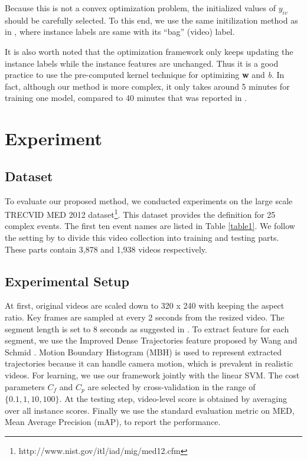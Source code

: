 Because this is not a convex optimization problem, the initialized values of $y_{iv}$ should be carefully selected. To this end, we use the same initilization method as in \cite{andrews2002support,lai2014video}, where instance labels are same with its ``bag'' (video) label. 

It is also worth noted that the optimization framework only keeps updating the instance labels while the instance features are unchanged. Thus it is a good practice to use the pre-computed kernel technique for optimizing \textbf{w} and \textit{b}. In fact, although our method is more complex, it only takes around 5 minutes for training one model, compared to 40 minutes that was reported in \cite{lai2014video}. 
\section{Experiment}
\label{c5_experiment}
\subsection{Dataset} To evaluate our proposed method, we conducted experiments on the large scale TRECVID MED 2012 dataset\footnote{http://www.nist.gov/itl/iad/mig/med12.cfm}. This dataset provides the definition for 25 complex events. The first ten event names are listed in Table \ref{table1}. We follow the setting by \cite{lai2014video} to divide this video collection into training and testing parts. These parts contain 3,878 and 1,938 videos respectively.

\subsection{Experimental Setup} At first, original videos are scaled down to 320 x 240 with keeping the aspect ratio. Key frames are sampled at every 2 seconds from the resized video. The segment length is set to 8 seconds as suggested in \cite{vahdat2013compositional}. To extract feature for each segment, we use the Improved Dense Trajectories feature proposed by Wang and Schmid \cite{wang2013action}. Motion Boundary Histogram (MBH) is used to represent extracted trajectories because it can handle camera motion, which is prevalent in realistic videos. For learning, we use our framework jointly with the linear SVM. The cost parameters $C_{f}$ and $C_{p}$ are selected by cross-validation in the range of $\{0.1, 1, 10, 100\}$. At the testing step, video-level score is obtained by averaging over all instance scores. Finally we use the standard evaluation metric on MED, Mean Average Precision (mAP), to report the performance.

